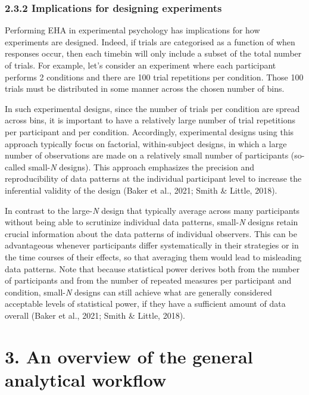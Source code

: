 \documentclass[
  man, donotrepeattitle,floatsintext]{apa6}
\begin{document}
\subsubsection{2.3.2 Implications for designing experiments}\label{implications-for-designing-experiments}

Performing EHA in experimental psychology has implications for how experiments are designed. Indeed, if trials are categorised as a function of when responses occur, then each timebin will only include a subset of the total number of trials. For example, let's consider an experiment where each participant performs 2 conditions and there are 100 trial repetitions per condition. Those 100 trials must be distributed in some manner across the chosen number of bins.

In such experimental designs, since the number of trials per condition are spread across bins, it is important to have a relatively large number of trial repetitions per participant and per condition. Accordingly, experimental designs using this approach typically focus on factorial, within-subject designs, in which a large number of observations are made on a relatively small number of participants (so-called small-\emph{N} designs). This approach emphasizes the precision and reproducibility of data patterns at the individual participant level to increase the inferential validity of the design (Baker et al., 2021; Smith \& Little, 2018).

In contrast to the large-\emph{N} design that typically average across many participants without being able to scrutinize individual data patterns, small-\emph{N} designs retain crucial information about the data patterns of individual observers. This can be advantageous whenever participants differ systematically in their strategies or in the time courses of their effects, so that averaging them would lead to misleading data patterns. Note that because statistical power derives both from the number of participants and from the number of repeated measures per participant and condition, small-\emph{N} designs can still achieve what are generally considered acceptable levels of statistical power, if they have a sufficient amount of data overall (Baker et al., 2021; Smith \& Little, 2018).

\section{3. An overview of the general analytical workflow}\label{an-overview-of-the-general-analytical-workflow}
\end{document}
